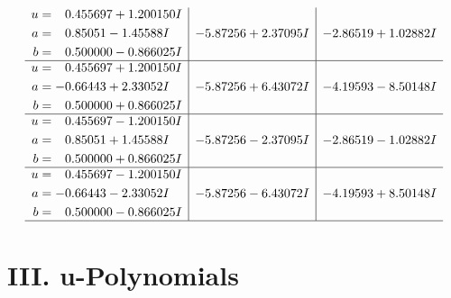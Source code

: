 \documentclass[1p]{elsarticle_modified}
\theoremstyle{definition}
\begin{document}
$$\begin{array}{c|c|c}
\begin{aligned}
u &= \phantom{-}0.455697 + 1.200150 I \\
a &= \phantom{-}0.85051 - 1.45588 I \\
b &= \phantom{-}0.500000 - 0.866025 I\end{aligned}
 & -5.87256 + 2.37095 I & -2.86519 + 1.02882 I \\ \hline\begin{aligned}
u &= \phantom{-}0.455697 + 1.200150 I \\
a &= -0.66443 + 2.33052 I \\
b &= \phantom{-}0.500000 + 0.866025 I\end{aligned}
 & -5.87256 + 6.43072 I & -4.19593 - 8.50148 I \\ \hline\begin{aligned}
u &= \phantom{-}0.455697 - 1.200150 I \\
a &= \phantom{-}0.85051 + 1.45588 I \\
b &= \phantom{-}0.500000 + 0.866025 I\end{aligned}
 & -5.87256 - 2.37095 I & -2.86519 - 1.02882 I \\ \hline\begin{aligned}
u &= \phantom{-}0.455697 - 1.200150 I \\
a &= -0.66443 - 2.33052 I \\
b &= \phantom{-}0.500000 - 0.866025 I\end{aligned}
 & -5.87256 - 6.43072 I & -4.19593 + 8.50148 I\\
 \hline 
 \end{array}$$\newpage
\newpage\renewcommand{\arraystretch}{1}
\centering \section*{ III. u-Polynomials}
\end{document}
